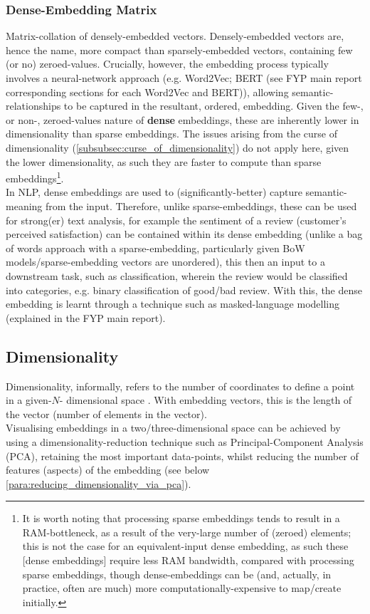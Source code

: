 \subsubsection{Dense-Embedding Matrix}
Matrix-collation of densely-embedded vectors. Densely-embedded vectors are, hence the name, more compact than sparsely-embedded vectors, containing few (or no) zeroed-values. Crucially, however, the embedding process typically involves a neural-network approach (e.g. Word2Vec; BERT (see FYP main report corresponding sections for each Word2Vec and BERT)), allowing semantic-relationships to be captured in the resultant, ordered, embedding. Given the few-, or non-, zeroed-values nature of \textbf{dense} embeddings, these are inherently lower in dimensionality than sparse embeddings. The issues arising from the curse of dimensionality (\cref{subsubsec:curse_of_dimensionality}) do not apply here, given the lower dimensionality, as such they are faster to compute than sparse embeddings\footnote{It is worth noting that processing sparse embeddings tends to result in a RAM-bottleneck, as a result of the very-large number of (zeroed) elements; this is not the case for an equivalent-input dense embedding, as such these [dense embeddings] require less RAM bandwidth, compared with processing sparse embeddings, though dense-embeddings can be (and, actually, in practice, often are much) more computationally-expensive to map/create initially.}.\\
In NLP, dense embeddings are used to (significantly-better) capture semantic-meaning from the input. Therefore, unlike sparse-embeddings, these can be used for strong(er) text analysis, for example the sentiment of a review (customer's perceived satisfaction) can be contained within its dense embedding (unlike a bag of words approach with a sparse-embedding, particularly given BoW models/sparse-embedding vectors are unordered), this then an input to a downstream task, such as classification, wherein the review would be classified into categories, e.g. binary classification of good/bad review. With this, the dense embedding is learnt through a technique such as masked-language modelling (explained in the FYP main report).
\subsection{Dimensionality}
\label{subsec:dimensionality}
Dimensionality, informally, refers to the number of coordinates to define a point in a given-$N$- dimensional space \citep{wikipedia:dimensionality}. With embedding vectors, this is the length of the vector (number of elements in the vector).\\
Visualising embeddings in a two/three-dimensional space can be achieved by using a dimensionality-reduction technique such as Principal-Component Analysis (PCA), retaining the most important data-points, whilst reducing the number of features (aspects) of the embedding (see below \cref{para:reducing_dimensionality_via_pca}).
